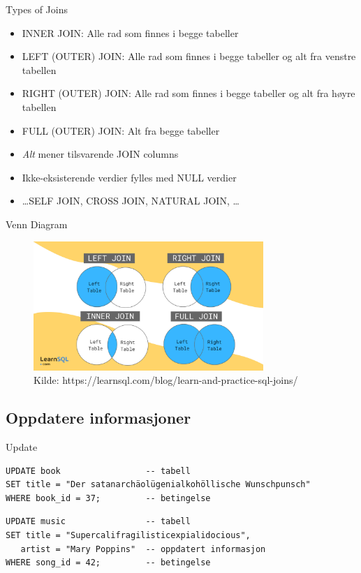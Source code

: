 \begin{frame}{Types of Joins}
\begin{itemize}
    \item INNER JOIN: Alle rad som finnes i begge tabeller
    \item LEFT (OUTER) JOIN: Alle rad som finnes i begge tabeller og alt fra venstre tabellen
    \item RIGHT (OUTER) JOIN: Alle rad som finnes i begge tabeller og alt fra høyre tabellen
    \item FULL (OUTER) JOIN: Alt fra begge tabeller
    \item \textit{Alt} mener tilsvarende JOIN columns
    \item Ikke-eksisterende verdier fylles med NULL verdier
    \item \dots SELF JOIN, CROSS JOIN, NATURAL JOIN, \dots
\end{itemize}
\end{frame}

\begin{frame}{Venn Diagram}
    \begin{figure}
        \centering
        \includegraphics[height = 4.9cm]{images/joins.png}
        \caption{Kilde: https://learnsql.com/blog/learn-and-practice-sql-joins/}
        \label{fig:venndiagram}
    \end{figure}
\end{frame}

\subsection*{Oppdatere informasjoner}
\begin{frame}[fragile]{Update}
\begin{verbatim}
UPDATE book                 -- tabell
SET title = "Der satanarchäolügenialkohöllische Wunschpunsch"
WHERE book_id = 37;         -- betingelse
\end{verbatim}
\begin{verbatim}
UPDATE music                -- tabell
SET title = "Supercalifragilisticexpialidocious",
   artist = "Mary Poppins"  -- oppdatert informasjon
WHERE song_id = 42;         -- betingelse
\end{verbatim}
\end{frame}

